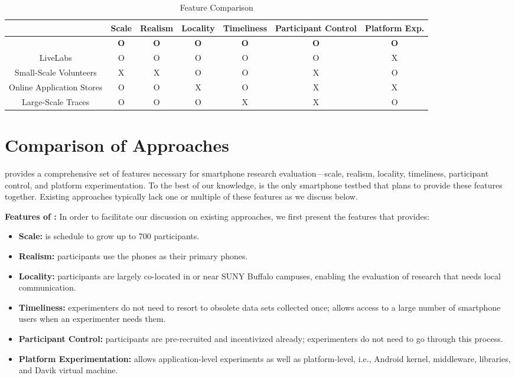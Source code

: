 \begin{table*}[t]
\centering
\begin{tabular}{|c|c|c|c|c|c|c|}
\hline
& Scale & Realism & Locality & Timeliness & Participant Control & Platform
Exp.\\
\hline
{\bf \PhoneLab{}} & {\bf O} & {\bf O} & {\bf O} & {\bf O} & {\bf O} & {\bf O}\\
LiveLabs{} & O & O & O & O & O & X\\
Small-Scale Volunteers & X & X & O & O & X & O\\
Online Application Stores & O & O & X & O & X & X\\
Large-Scale Traces & O & O & O & X & X & O\\
\hline
\end{tabular}
\caption{Feature Comparison}
\label{tab:comparison}
\end{table*}

\section{Comparison of Approaches}
\label{sec:comparison}

\PhoneLab{} provides a comprehensive set of features necessary for smartphone
research evaluation---scale, realism, locality, timeliness, participant control,
and platform experimentation. To the best of our knowledge, \PhoneLab{} is the
only smartphone testbed that plans to provide these features together. Existing
approaches typically lack one or multiple of these features as we discuss below.

{\bf Features of \PhoneLab{}:} In order to facilitate our discussion on existing
approaches, we first present the features that \PhoneLab{} provides:

\begin{itemize}[nosep]
\item {\bf Scale:} \PhoneLab{} is schedule to grow up to 700 participants.
\item {\bf Realism:} \PhoneLab{} participants use the phones as their primary
phones.
\item {\bf Locality:} \PhoneLab{} participants are largely co-located in or near
SUNY Buffalo campuses, enabling the evaluation of research that needs local
communication.
\item {\bf Timeliness:} \PhoneLab{} experimenters do not need to resort to
obsolete data sets collected once; \PhoneLab{} allows access to a large number
of smartphone users when an experimenter needs them.
\item {\bf Participant Control:} \PhoneLab{} participants are pre-recruited and
incentivized already; experimenters do not need to go through this process.
\item {\bf Platform Experimentation:} \PhoneLab{} allows application-level
experiments as well as platform-level, i.e., Android kernel, middleware,
libraries, and Davik virtual machine.
\end{itemize}

